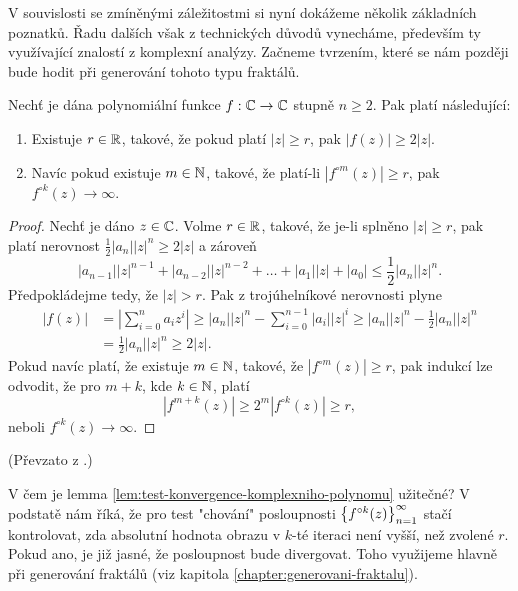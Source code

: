 V souvislosti se zmíněnými záležitostmi si nyní dokážeme několik základních poznatků. Řadu dalších však z technických důvodů vynecháme, především ty využívající znalostí z komplexní analýzy. Začneme tvrzením, které se nám později bude hodit při generování tohoto typu fraktálů.
\begin{lemma}\label{lem:test-konvergence-komplexniho-polynomu}
    Nechť je dána polynomiální funkce $f:\mathbb{C} \rightarrow \mathbb{C}$ stupně $n\geqslant 2$. Pak platí následující:
    \begin{enumerate}[label=(\roman*)]
        \item Existuje $r\in\mathbb{R}$, takové, že pokud platí $|z|\geqslant r$, pak $|f(z)|\geqslant2|z|$.
        \item Navíc pokud existuje $m\in\mathbb{N}$, takové, že platí-li $|f^{\circ m}(z)|\geqslant r$, pak $f^{\circ k}(z)\to\infty$.
    \end{enumerate} 
\end{lemma}
\begin{proof}
    Nechť je dáno $z\in\mathbb{C}$. Volme $r\in\mathbb{R}$, takové, že je-li splněno $|z|\geqslant r$, pak platí nerovnost $\frac{1}{2}|a_n||z|^n\geqslant 2|z|$ a zároveň
    \[|a_{n-1}||z|^{n-1}+|a_{n-2}||z|^{n-2}+\dots+|a_1||z|+|a_0|\leqslant\frac{1}{2}|a_n||z|^n.\]
    Předpokládejme tedy, že $|z|>r$. Pak z trojúhelníkové nerovnosti plyne
    \begin{align*}
        |f(z)|&=\left|\sum_{i=0}^{n}a_iz^i\right|\geqslant|a_n||z|^n-\sum_{i=0}^{n-1}|a_i||z|^i\geqslant|a_n||z|^n-\frac{1}{2}|a_n||z|^n\\
        &=\frac{1}{2}|a_n||z|^n\geqslant2|z|.
    \end{align*}
    Pokud navíc platí, že existuje $m\in\mathbb{N}$, takové, že $|f^{\circ m}(z)|\geqslant r$, pak indukcí lze odvodit, že pro $m+k$, kde $k\in\mathbb{N}$, platí
    \[|f^{m+k}(z)|\geqslant2^m|f^{\circ k}(z)|\geqslant r,\]
    neboli $f^{\circ k}(z)\to\infty$.
\end{proof}
(Převzato z \cite[str. 237]{Falconer1989}.)

V čem je lemma \ref{lem:test-konvergence-komplexniho-polynomu} užitečné? V podstatě nám říká, že pro test "chování" posloupnosti $\left\{f^{\circ k}(z)\right\}_{n=1}^\infty$ stačí kontrolovat, zda absolutní hodnota obrazu v $k$-té iteraci není vyšší, než zvolené $r$. Pokud ano, je již jasné, že posloupnost bude divergovat. Toho využijeme hlavně při generování fraktálů (viz kapitola \ref{chapter:generovani-fraktalu}).

